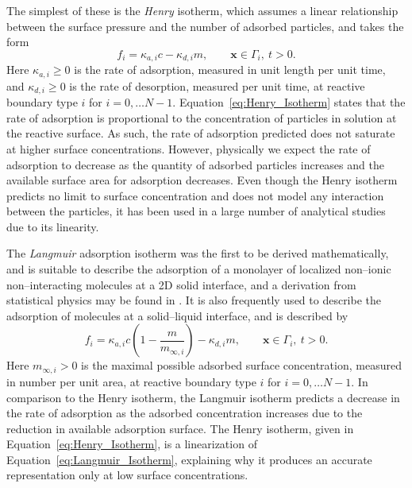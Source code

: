 \documentclass[preprint, 1p, authoryear]{elsarticle}
\begin{document}
The simplest of these is the \emph{Henry} isotherm, which assumes a linear relationship  between the surface pressure and the number of adsorbed particles, and takes the form
\begin{equation}
f_i = \kappa_{a,i} c  - \kappa_{d,i} m, \qquad \mathbf{x} \in \Gamma_i, \: t > 0. \label{eq:Henry_Isotherm}
\end{equation}
Here $\kappa_{a,i} \geq 0$ is the rate of adsorption, measured in unit length per unit time, and $\kappa_{d,i} \geq 0$ is the rate of desorption, measured per unit time, at reactive boundary type $i$ for $i = 0, \ldots N-1$.  Equation~\eqref{eq:Henry_Isotherm} states that the rate of adsorption is proportional to the concentration of particles in solution at the reactive surface. As such, the rate of adsorption predicted does not saturate at higher surface concentrations. However, physically we  expect the rate of adsorption to decrease as the quantity of adsorbed particles increases and the available surface area for adsorption decreases.  Even though the Henry isotherm predicts no  limit to surface concentration and does not model any interaction between the particles,  it has been used in a large number of analytical studies  due to its linearity.  
 

The \emph{Langmuir} adsorption isotherm was the first to be derived mathematically, and is suitable to describe the adsorption of a monolayer of  localized non--ionic non--interacting molecules at a 2D solid interface, and a derivation from statistical physics may be found  in \citep{Baret1969Theoretical}.  It is also  frequently used to describe the  adsorption of molecules at a solid--liquid interface, and is described by
\begin{equation}
f_i = \kappa_{a,i} c\left( 1 - \frac{m}{m_{\infty,i}}\right) - \kappa_{d,i} m, \qquad \mathbf{x} \in \Gamma_i, \: t > 0. \label{eq:Langmuir_Isotherm}
\end{equation}
Here $m_{\infty, i}>0$ is the maximal possible adsorbed surface concentration, measured in number per unit area, at reactive boundary type $i$ for $i = 0, \ldots N-1$.   In comparison to the Henry isotherm, the Langmuir isotherm predicts a decrease in the rate of adsorption as the adsorbed concentration increases  due to the reduction in available adsorption surface.  The Henry isotherm, given in Equation~\eqref{eq:Henry_Isotherm}, is a linearization of Equation~\eqref{eq:Langmuir_Isotherm}, explaining why it produces an accurate representation only at low surface concentrations.    
\end{document}
